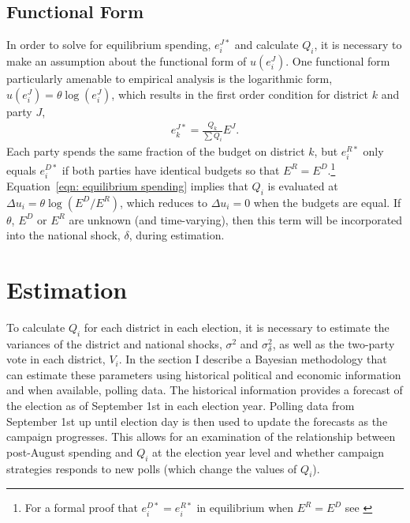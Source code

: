 \documentclass[12pt,final,fleqn]{article}
\theoremstyle{plain}
\begin{document}
\subsection{Functional Form} \label{sec: functional form}
In order to solve for equilibrium spending, $e_i^{J*}$ and calculate $Q_i$, it is necessary to make an assumption about the functional form of $u(e_i^J)$. One functional form particularly amenable to empirical analysis is the logarithmic form, $u(e_i^J)= \theta \log (e_i^J)$, which results in the first order condition for district $k$ and party $J$,
\begin{align} \label{eqn: equilibrium spending}
e_k^{J*} = \frac{Q_k}{\sum Q_i}E^{J}.
\end{align} 
Each party spends the same fraction of the budget on district $k$, but $e_i^{R*}$ only equals $e_i^{D*}$ if both parties have identical budgets so that $E^{R} = E^{D}$.\footnote{For a formal proof that $e_i^{D*} = e_i^{R*}$ in equilibrium when $E^R = E^D$ see \citet{stromberg2008electoral}} Equation~\ref{eqn: equilibrium spending} implies that $Q_i$ is evaluated at $\Delta u_i = \theta \log(E^D/E^R)$, which reduces to $\Delta u_i=0$ when the budgets are equal. If $\theta$, $E^D$ or $E^R$ are unknown (and time-varying), then this term will be incorporated into the national shock, $\delta$, during estimation.

\section{Estimation}
To calculate $Q_i$ for each district in each election, it is necessary to estimate the variances of the district and national shocks, $\sigma^2$ and $\sigma^2_\delta$, as well as the two-party vote in each district, $V_i$. In the section I describe a Bayesian methodology that can estimate these parameters using historical political and economic information and when available, polling data. The historical information provides a forecast of the election as of September 1st in each election year. Polling data from September 1st up until election day is then used to update the forecasts as the campaign progresses. This allows for an examination of the relationship between post-August spending and $Q_i$ at the election year level and whether campaign strategies responds to new polls (which change the values of $Q_i$).
\end{document}
